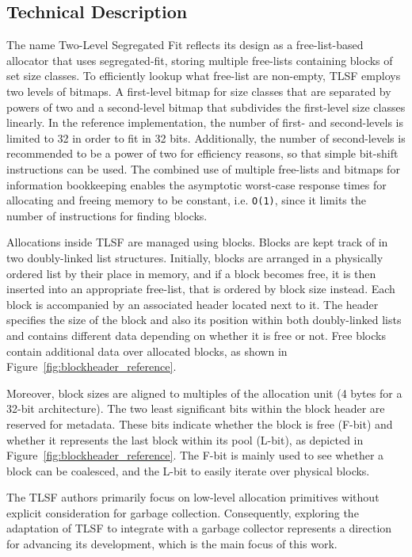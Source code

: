 \subsection{Technical Description}

The name Two-Level Segregated Fit reflects its design as a free-list-based allocator that uses segregated-fit, storing multiple free-lists containing blocks of set size classes. To efficiently lookup what free-list are non-empty, TLSF employs two levels of bitmaps. A first-level bitmap for size classes that are separated by powers of two and a second-level bitmap that subdivides the first-level size classes linearly. In the reference implementation, the number of first- and second-levels is limited to 32 in order to fit in 32 bits. Additionally, the number of second-levels is recommended to be a power of two for efficiency reasons, so that simple bit-shift instructions can be used. The combined use of multiple free-lists and bitmaps for information bookkeeping enables the asymptotic worst-case response times for allocating and freeing memory to be constant, i.e. \texttt{O(1)}, since it limits the number of instructions for finding blocks.

Allocations inside TLSF are managed using blocks. Blocks are kept track of in two doubly-linked list structures. Initially, blocks are arranged in a physically ordered list by their place in memory, and if a block becomes free, it is then inserted into an appropriate free-list, that is ordered by block size instead. Each block is accompanied by an associated header located next to it. The header specifies the size of the block and also its position within both doubly-linked lists and contains different data depending on whether it is free or not. Free blocks contain additional data over allocated blocks, as shown in Figure~\ref{fig:blockheader_reference}.

Moreover, block sizes are aligned to multiples of the allocation unit (4 bytes for a 32-bit architecture). The two least significant bits within the block header are reserved for metadata. These bits indicate whether the block is free (F-bit) and whether it represents the last block within its pool (L-bit), as depicted in Figure~\ref{fig:blockheader_reference}. The F-bit is mainly used to see whether a block can be coalesced, and the L-bit to easily iterate over physical blocks.

The TLSF authors primarily focus on low-level allocation primitives without explicit consideration for garbage collection. Consequently, exploring the adaptation of TLSF to integrate with a garbage collector represents a direction for advancing its development, which is the main focus of this work.


